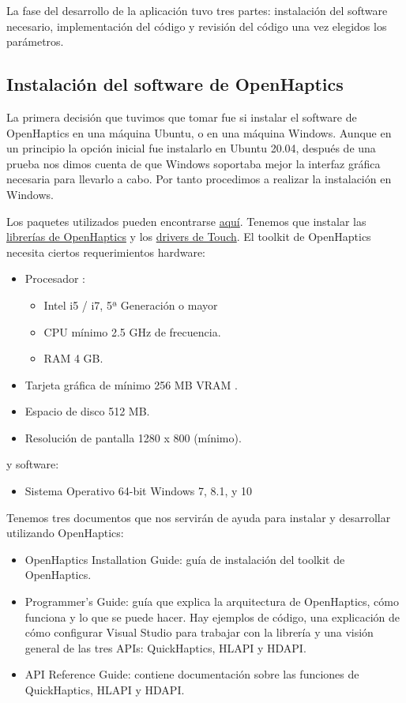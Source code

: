 \documentclass[a4paper,11pt, oneside]{book}
\begin{document}
La fase del desarrollo de la aplicación tuvo tres partes: instalación del software necesario, implementación del código y revisión del código una vez elegidos los parámetros.

\subsection{Instalación del software de OpenHaptics}

La primera decisión que tuvimos que tomar fue si instalar el software de OpenHaptics en una máquina Ubuntu, o en una máquina Windows. Aunque en un principio la opción inicial fue instalarlo en Ubuntu 20.04, después de una prueba nos dimos cuenta de que Windows soportaba mejor la interfaz gráfica necesaria para llevarlo a cabo. Por tanto procedimos a realizar la instalación en Windows.

Los paquetes utilizados pueden encontrarse \href{https://support.3dsystems.com/s/article/OpenHaptics-for-Windows-Developer-Edition-v35?language=en\_US}{aquí}. Tenemos que instalar las \href{https://s3.amazonaws.com/dl.3dsystems.com/binaries/Sensable/OH/3.5/OpenHaptics_Developer_Edition_v3.5.0.zip}{librerías de OpenHaptics} y los \href{https://s3.amazonaws.com/dl.3dsystems.com/binaries/Sensable/driver/Touch_Device_Driver_2023.1.4.exe}{drivers de Touch}.
El toolkit de OpenHaptics necesita ciertos requerimientos hardware:
\begin{itemize}
	\item Procesador : 
	\begin{itemize}
		\item Intel i5 / i7, 5ª Generación o mayor 
		\item CPU mínimo 2.5 GHz de frecuencia.
		\item RAM 4 GB.
	\end{itemize}
	\item Tarjeta gráfica de mínimo 256 MB VRAM .
	\item Espacio de disco 512 MB.
	\item Resolución de pantalla 1280 x 800 (mínimo).
\end{itemize}
y software:
\begin{itemize}
	\item Sistema Operativo 64-bit Windows 7, 8.1, y 10
\end{itemize}

Tenemos tres documentos que nos servirán de ayuda para instalar y desarrollar utilizando OpenHaptics:
\begin{itemize}
	\item OpenHaptics Installation Guide: guía de instalación del toolkit de OpenHaptics.
	\item Programmer’s Guide: guía que explica la arquitectura de OpenHaptics, cómo funciona y lo que se puede hacer. Hay ejemplos de código, una explicación de cómo configurar Visual Studio para trabajar con la librería y una visión general de las tres APIs: QuickHaptics, HLAPI y HDAPI.
	\item API Reference Guide: contiene documentación sobre las funciones de QuickHaptics, HLAPI y HDAPI.
\end{itemize}
\end{document}
